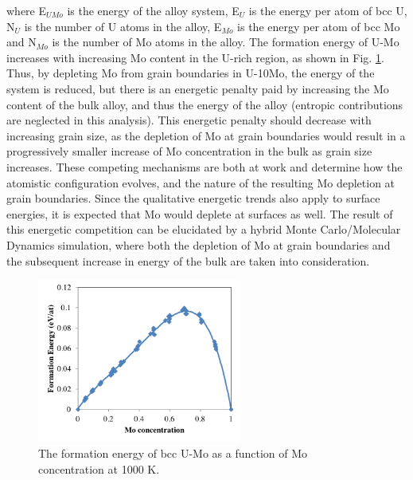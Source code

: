 \documentclass[review]{elsarticle}
\begin{document}
where E$_{UMo}$ is the energy of the alloy system, E$_{U}$ is the energy per atom of bcc U, N$_{U}$ is the number of U atoms in the alloy, E$_{Mo}$ is the energy per atom of bcc Mo and N$_{Mo}$ is the number of Mo atoms in the alloy. The formation energy of U-Mo increases with increasing Mo content in the U-rich region, as shown in Fig. \ref{fig:umoform}. Thus, by depleting Mo from grain boundaries in U-10Mo, the energy of the system is reduced, but there is an energetic penalty paid by increasing the Mo content of the bulk alloy, and thus the energy of the alloy (entropic contributions are neglected in this analysis). This energetic penalty should decrease with increasing grain size, as the depletion of Mo at grain boundaries would result in a progressively smaller increase of Mo concentration in the bulk as grain size increases. These competing mechanisms are both at work and determine how the atomistic configuration evolves, and the nature of the resulting Mo depletion at grain boundaries. Since the qualitative energetic trends also apply to surface energies, it is expected that Mo would deplete at surfaces as well. The result of this energetic competition can be elucidated by a hybrid Monte Carlo/Molecular Dynamics simulation, where both the depletion of Mo at grain boundaries and the subsequent increase in energy of the bulk are taken into consideration.

\begin{figure}[h]
 \centering
 \includegraphics[width=0.6\textwidth]{umoform.png} 
 \caption{The formation energy of bcc U-Mo as a function of Mo concentration at 1000 K.}
 \label{fig:umoform}
\end{figure}
\end{document}

